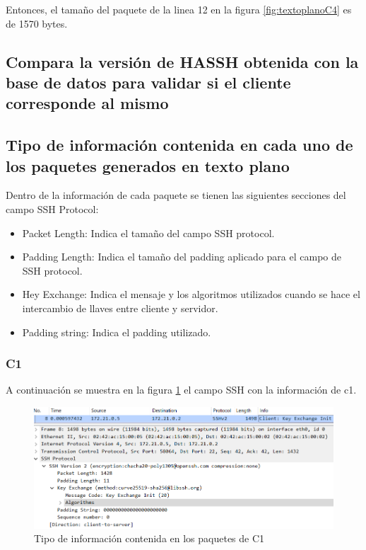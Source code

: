 \documentclass[letter,12pt]{article}
\begin{document}
Entonces, el tamaño del paquete de la linea 12 en la figura \ref{fig:textoplanoC4} es de 1570 bytes.



\subsection{Compara la versión de HASSH obtenida con la base de datos para validar si el cliente corresponde al mismo}




\clearpage

\subsection{Tipo de información contenida en cada uno de los paquetes generados en texto plano}

Dentro de la información de cada paquete se tienen las siguientes secciones del campo SSH Protocol:

\begin{itemize}
    \item Packet Length: Indica el tamaño del campo SSH protocol.

    \item Padding Length: Indica el tamaño del padding aplicado para el campo de SSH protocol.

    \item Hey Exchange: Indica el mensaje y los algoritmos utilizados cuando se hace el intercambio de llaves entre cliente y servidor.

    \item Padding string: Indica el padding utilizado.

    
\end{itemize}

\subsubsection{C1}

A continuación se muestra en la figura \ref{fig:textoplanoC1} el campo SSH con la información de c1.


\begin{figure}[ht]
    \centering
    \includegraphics[width=1\linewidth]{Images/parte1/textoplano/textoplanoC1.png}
    \caption{Tipo de información contenida en los paquetes de C1}
    \label{fig:textoplanoC1}
\end{figure}
\end{document}
